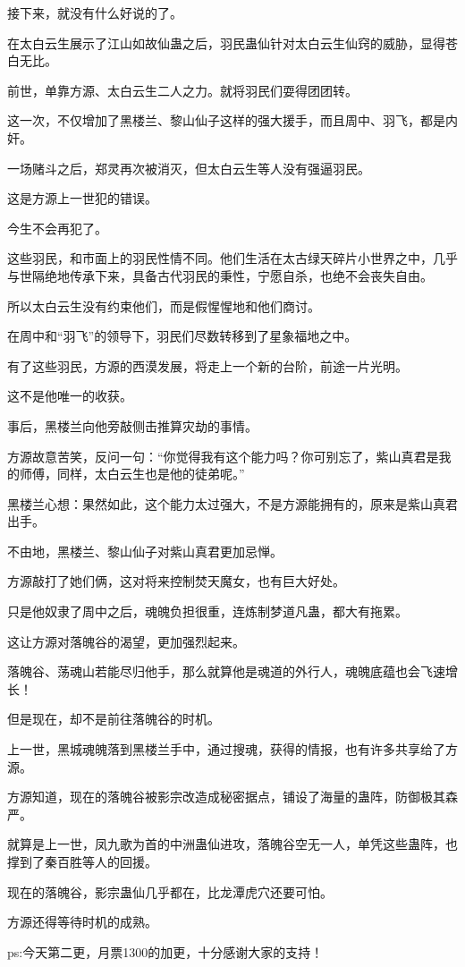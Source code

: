 \begin{this_body}
接下来，就没有什么好说的了。

在太白云生展示了江山如故仙蛊之后，羽民蛊仙针对太白云生仙窍的威胁，显得苍白无比。

前世，单靠方源、太白云生二人之力。就将羽民们耍得团团转。

这一次，不仅增加了黑楼兰、黎山仙子这样的强大援手，而且周中、羽飞，都是内奸。

一场赌斗之后，郑灵再次被消灭，但太白云生等人没有强逼羽民。

这是方源上一世犯的错误。

今生不会再犯了。

这些羽民，和市面上的羽民性情不同。他们生活在太古绿天碎片小世界之中，几乎与世隔绝地传承下来，具备古代羽民的秉性，宁愿自杀，也绝不会丧失自由。

所以太白云生没有约束他们，而是假惺惺地和他们商讨。

在周中和“羽飞”的领导下，羽民们尽数转移到了星象福地之中。

有了这些羽民，方源的西漠发展，将走上一个新的台阶，前途一片光明。

这不是他唯一的收获。

事后，黑楼兰向他旁敲侧击推算灾劫的事情。

方源故意苦笑，反问一句：“你觉得我有这个能力吗？你可别忘了，紫山真君是我的师傅，同样，太白云生也是他的徒弟呢。”

黑楼兰心想：果然如此，这个能力太过强大，不是方源能拥有的，原来是紫山真君出手。

不由地，黑楼兰、黎山仙子对紫山真君更加忌惮。

方源敲打了她们俩，这对将来控制焚天魔女，也有巨大好处。

只是他奴隶了周中之后，魂魄负担很重，连炼制梦道凡蛊，都大有拖累。

这让方源对落魄谷的渴望，更加强烈起来。

落魄谷、荡魂山若能尽归他手，那么就算他是魂道的外行人，魂魄底蕴也会飞速增长！

但是现在，却不是前往落魄谷的时机。

上一世，黑城魂魄落到黑楼兰手中，通过搜魂，获得的情报，也有许多共享给了方源。

方源知道，现在的落魄谷被影宗改造成秘密据点，铺设了海量的蛊阵，防御极其森严。

就算是上一世，凤九歌为首的中洲蛊仙进攻，落魄谷空无一人，单凭这些蛊阵，也撑到了秦百胜等人的回援。

现在的落魄谷，影宗蛊仙几乎都在，比龙潭虎穴还要可怕。

方源还得等待时机的成熟。

ps:今天第二更，月票1300的加更，十分感谢大家的支持！

\end{this_body}

